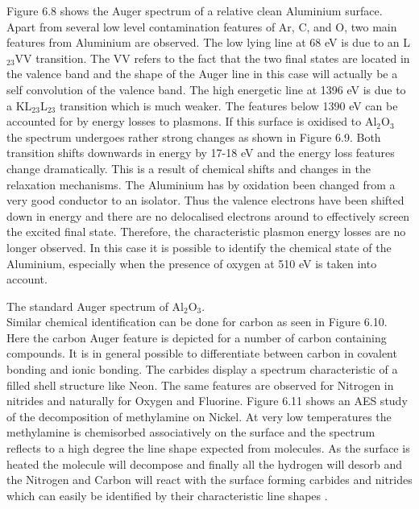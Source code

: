              Figure 6.8 shows the Auger spectrum of a  relative  clean
          Aluminium surface. Apart  from  several  low  level
          contamination features of Ar, C, and O, two main features from
          Aluminium are observed. The low lying line at 68 eV  is  due
          to an L$_{23}$VV transition. The VV refers to the  fact  that
          the two final states are located in the valence band and the
          shape of the Auger line in this case will actually be a self
          convolution of the valence band. The high energetic line  at
          1396 eV is due to a KL$_{23}$L$_{23}$  transition  which  is
          much weaker. The features below 1390 eV can be accounted for
          by energy losses to plasmons. If this surface is oxidised to
          Al$_{2}$O$_{3}$ the spectrum undergoes rather strong changes
          as shown in Figure 6.9. Both transition shifts downwards  in
          energy by 17-18 eV and  the  energy  loss  features  change
          dramatically. This  is  a  result  of  chemical  shifts  and
          changes in the relaxation mechanisms. The Aluminium  has  by
          oxidation been changed from a  very  good  conductor  to  an
          isolator. Thus the valence electrons have been shifted down in
          energy and there are no delocalised electrons around to
          effectively screen the excited final state. Therefore, the
          characteristic plasmon energy losses are no longer observed.
          In this case it is possible to identify the chemical
          state of the Aluminium, especially when the presence of
          oxygen at 510 eV is taken into account. \newpage 

           \vspace*{10cm}

           The standard  Auger  spectrum  of
          Al$_{2}$O$_{3}$.\\


             Similar chemical identification can be done for carbon as
          seen in Figure 6.10. Here the carbon Auger feature is depicted
          for a number  of  carbon  containing  compounds.  It  is  in
          general possible to differentiate between carbon in covalent
          bonding and ionic bonding. The carbides display a  spectrum
          characteristic of a filled shell structure  like  Neon.  The
          same features are observed  for  Nitrogen  in  nitrides  and
          naturally for Oxygen and Fluorine. Figure 6.11 shows  an
          AES study of the decomposition of methylamine on Nickel. At
          very low temperatures the methylamine is chemisorbed
          associatively on the surface and the spectrum reflects to a
          high degree the line shape expected from molecules. As the
          surface is heated the molecule will decompose and finally
          all the hydrogen will desorb and the Nitrogen and Carbon
          will react with the surface forming carbides and nitrides
          which can easily be identified by their characteristic line
          shapes \cite{chorkendorff3}.

